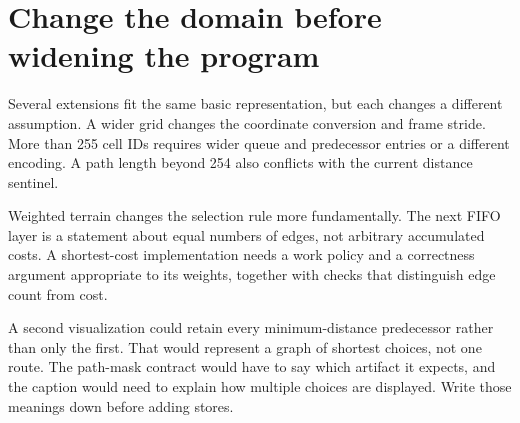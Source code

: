 \section{Change the domain before widening the program}\label{maze-p13}

Several extensions fit the same basic representation, but each changes a different assumption. A wider grid changes the coordinate conversion and frame stride. More than 255 cell IDs requires wider queue and predecessor entries or a different encoding. A path length beyond 254 also conflicts with the current distance sentinel.

Weighted terrain changes the selection rule more fundamentally. The next FIFO layer is a statement about equal numbers of edges, not arbitrary accumulated costs. A shortest-cost implementation needs a work policy and a correctness argument appropriate to its weights, together with checks that distinguish edge count from cost.

A second visualization could retain every minimum-distance predecessor rather than only the first. That would represent a graph of shortest choices, not one route. The path-mask contract would have to say which artifact it expects, and the caption would need to explain how multiple choices are displayed. Write those meanings down before adding stores.
